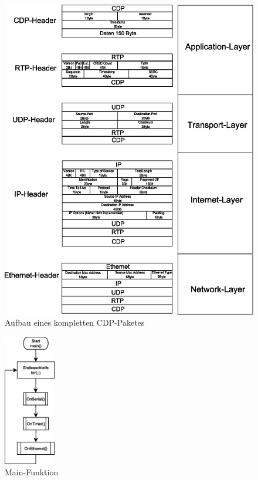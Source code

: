 \documentclass[a4paper]{book}%
\begin{document}
\begin{figure}[H]
	\centering
	\includegraphics[width=1.0\textwidth]{figures/schrittweiseraufbaueinespaketes.eps}
	\caption[Aufbau eines kompletten CDP-Paketes]{Aufbau eines kompletten CDP-Paketes}
	\label{fig:aufbauPaket}
\end{figure}

\begin{figure}[H]
	\centering
	\includegraphics[width=0.2\textwidth]{figures/onmain.eps}
	\caption[Main-Funktion]{Main-Funktion}
	\label{fig:onmain}
\end{figure}
\end{document}
